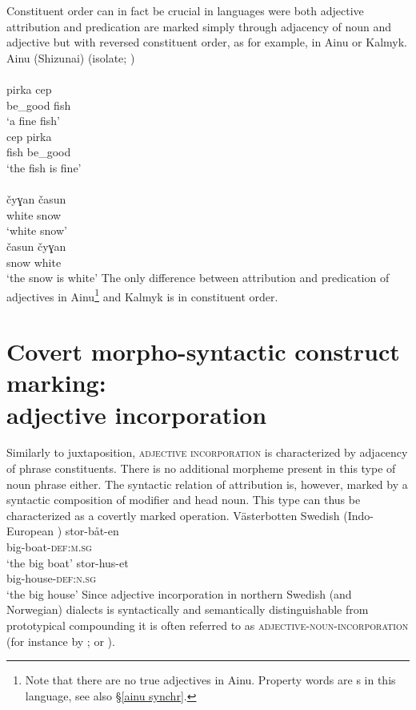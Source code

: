Constituent order can in fact be crucial in languages were both adjective attribution and predication are marked simply through adjacency of noun and adjective but with reversed constituent order, as for example, in Ainu or Kalmyk. 
\ea
{}
{\rm Ainu (Shizunai) (isolate; \citealt{refsing1986})}\\
\\
\gll	pirka cep\\
	be\_good fish\\
\glt	‘a fine fish’
\\
\gll	cep pirka\\
	fish be\_good\\
\glt	‘the fish is fine’
\z
\z
\ea
{}\\
\\
\gll	čyɣan časun\\
	white snow\\
\glt	‘white snow’
\\
\gll	časun čyɣan\\
	snow white\\
\glt	‘the snow is white’
\z
\z
The only difference between attribution and predication of adjectives in Ainu\footnote{Note that there are no true adjectives in Ainu. Property words are s in this language, see also \S\ref{ainu synchr}.} and Kalmyk is in constituent order.

\section[Incorporation]{Covert morpho-syntactic construct marking:\\adjective incorporation}
\label{attr incorporation}
Similarly to juxtaposition, \textsc{adjective incorporation} is characterized by adjacency of phrase constituents. There is no additional morpheme present in this type of noun phrase either. The syntactic relation of attribution is, however, marked by a syntactic composition of modifier and head noun. This type can thus be characterized as a covertly marked operation.
\ea 
\label{bondska compound}
{\rm Västerbotten Swedish (Indo-European \citealt{larsson1929})}
\ea
\gll 	stor-båt-en\\	
	big-boat-\textsc{def:m.sg}\\
\glt	‘the big boat’
\ex
\gll 	stor-hus-et\\
	big-house-\textsc{def:n.sg}\\
\glt	‘the big house’
\z
\z
Since adjective incorporation in northern Swedish (and Norwegian) dialects is syntactically and semantically distinguishable from prototypical compounding it is often referred to as \textsc{adjective-noun-incorporation} (for instance by \citealt{sandstrom-etal2003}; \citealt[127–129]{dahl2015a} or \citealt[61]{julien2005}).


